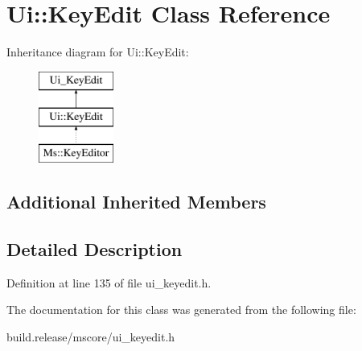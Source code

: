 \hypertarget{class_ui_1_1_key_edit}{}\section{Ui\+:\+:Key\+Edit Class Reference}
\label{class_ui_1_1_key_edit}
Inheritance diagram for Ui\+:\+:Key\+Edit\+:\begin{figure}[H]
\begin{center}
\leavevmode
\includegraphics[height=3.000000cm]{class_ui_1_1_key_edit}
\end{center}
\end{figure}
\subsection*{Additional Inherited Members}


\subsection{Detailed Description}


Definition at line 135 of file ui\+\_\+keyedit.\+h.



The documentation for this class was generated from the following file\+:\begin{DoxyCompactItemize}
\item 
build.\+release/mscore/ui\+\_\+keyedit.\+h\end{DoxyCompactItemize}

